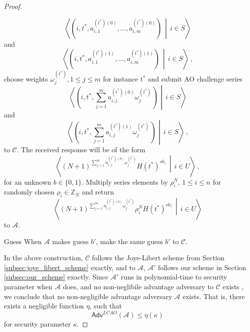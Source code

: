 \documentclass[10pt,letterpaper,oneside,twocolumn,journal]{IEEEtran}
\theoremstyle{definition}
\theoremstyle{definition}
\theoremstyle{remark}
\begin{document}
\begin{proof}
\begin{LaTeXdescription}
\begin{equation*}
            \left\langle\left(i,t^*,a^{(t^*)(0)}_{i,1},\dots,a^{(t^*)(0)}_{i,m}\right)\,\middle|\,i \in S\right\rangle
        \end{equation*}
        and
        \begin{equation*}
            \left\langle\left(i,t^*,a^{(t^*)(1)}_{i,1},\dots,a^{(t^*)(1)}_{i,m}\right)\,\middle|\, i \in S\right\rangle\,,
        \end{equation*}
        choose weights $\omega^{(t^*)}_j,1 \leq j \leq m$ for instance $t^*$ and submit AO challenge series
        \begin{equation*}
            \left\langle\left(i,t^*,\sum^m_{j=1}a^{(t^*)(0)}_{i,j}\omega^{(t^*)}_j\right)\,\middle|\,i \in S\right\rangle
        \end{equation*}
        and
        \begin{equation*}
            \left\langle\left(i,t^*,\sum^m_{j=1}a^{(t^*)(1)}_{i,j}\omega^{(t^*)}_j\right)\,\middle|\,i \in S\right\rangle\,,
        \end{equation*}
        to $\mathcal{C}$. The received response will be of the form 
        \begin{equation*}
            \left\langle(N+1)^{\sum^m_{j=1}a^{(t^*)(b)}_{i,j}\omega^{(t^*)}_j}H(t^*)^{sk_i}\,\middle|\,i\in U\right\rangle\,,
        \end{equation*}
        for an unknown $b \in \{0,1\}$. Multiply series elements by $\rho_i^N,\,1 \leq i \leq n$ for randomly chosen $\rho_i \in \mathbb{Z}_N$ and return
        \begin{equation*}
            \left\langle(N+1)^{\sum^m_{j=1}a^{(t^*)(b)}_{i,j}\omega^{(t^*)}_j}\rho_i^N H(t^*)^{sk_i}\,\middle|\,i\in U\right\rangle
        \end{equation*}
        to $\mathcal{A}$.
        \item[Guess] When $\mathcal{A}$ makes guess $b'$, make the same guess $b'$ to $\mathcal{C}$.
    \end{LaTeXdescription}

    In the above construction, $\mathcal{C}$ follows the Joye-Libert scheme from Section \ref{subsec:joye_libert_scheme} exactly, and to $\mathcal{A}$, $\mathcal{A}'$ follows our scheme in Section \ref{subsec:our_scheme} exactly. Since $\mathcal{A}'$ runs in polynomial-time to security parameter when $\mathcal{A}$ does, and no non-neglibile advantage adversary to $\mathcal{C}$ exists \cite{joyeScalableSchemePrivacyPreserving2013}, we conclude that no non-negligible advantage adversary $\mathcal{A}$ exists. That is, there exists a negligible function $\eta$, such that
    \begin{equation*}
        \mathsf{Adv}^{LCAO}(\mathcal{A}) \leq \eta(\kappa)
    \end{equation*}
    for security parameter $\kappa$.
\end{proof}
\end{document}
